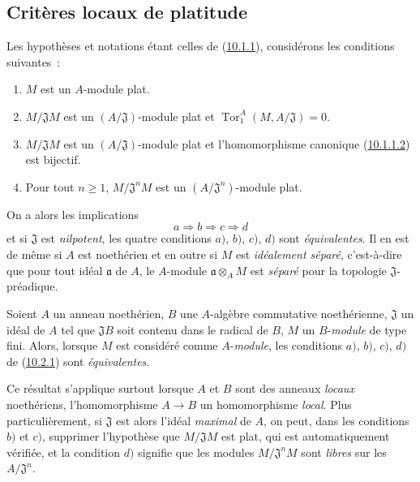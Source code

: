 \subsection{Critères locaux de platitude}
\label{subsection:0.10.2-fr}

\begin{env}[10.2.1]
\label{0.10.2.1-fr}
Les hypothèses et notations étant celles de
(\hyperref[0.10.1.1-fr]{10.1.1}), considérons les conditions suivantes~:
\begin{enumerate}
  \item[$a)$] $M$ est un $A$-module plat.
  \item[$b)$] $M/\mathfrak{J}M$ est un $(A/\mathfrak{J})$-module plat et
    $\operatorname{Tor}_1^A(M,A/\mathfrak{J})=0$.
  \item[$c)$] $M/\mathfrak{J}M$ est un $(A/\mathfrak{J})$-module plat et
    l'homomorphisme canonique (\hyperref[0.10.1.1.2-fr]{10.1.1.2}) est
    bijectif.
  \item[$d)$] Pour tout $n\geq1$, $M/\mathfrak{J}^nM$ est un
    $(A/\mathfrak{J}^n)$-module plat.
\end{enumerate}
On a alors les implications
\[
  a\Rightarrow b\Rightarrow c\Rightarrow d
\]
et si $\mathfrak{J}$ est \emph{nilpotent}, les quatre conditions $a)$, $b)$,
$c)$, $d)$ sont \emph{équivalentes}. Il en est de même si $A$ est noethérien
et en outre si $M$ est \emph{idéalement séparé}, c'est-à-dire que pour tout
idéal $\mathfrak{a}$ de $A$, le $A$-module $\mathfrak{a}\otimes_A M$ est
\emph{séparé} pour la topologie $\mathfrak{J}$-préadique.
\end{env}

\begin{env}[10.2.2]
\label{0.10.2.2-fr}
Soient $A$ un anneau noethérien, $B$ une $A$-algèbre commutative noethérienne,
$\mathfrak{J}$ un idéal de $A$ tel que $\mathfrak{J}B$ soit contenu dans le
radical de $B$, $M$ un $B$-\emph{module} de type fini. Alors, lorsque $M$ est
considéré comme $A$-\emph{module}, les conditions $a)$, $b)$, $c)$, $d)$ de
(\hyperref[0.10.2.1-fr]{10.2.1}) sont \emph{équivalentes}.

Ce résultat s'applique surtout lorsque $A$ et $B$ sont des anneaux
\emph{locaux} noethériens, l'homomorphisme $A\to B$ un homomorphisme
\emph{local}. Plus particulièrement, si $\mathfrak{J}$ est alors l'idéal
\emph{maximal} de $A$, on peut, dans les conditions $b)$ et $c)$, supprimer
l'hypothèse que $M/\mathfrak{J}M$ est plat, qui est automatiquement vérifiée,
et la condition $d)$ signifie que les modules $M/\mathfrak{J}^nM$ sont
\emph{libres} sur les $A/\mathfrak{J}^n$.
\end{env}

